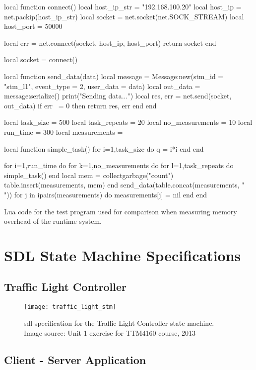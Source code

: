 \begin{appendices}
\begin{listing}[htp]
\begin{luacode}
local function connect()
	local host_ip_str = "192.168.100.20"
	local host_ip = net.packip(host_ip_str)
	local socket = net.socket(net.SOCK_STREAM)
	local host_port = 50000

	local err = net.connect(socket, host_ip, host_port)
	return socket
end

local socket = connect()

local function send_data(data)
	local message = Message:new({stm_id = "stm_l1", event_type = 2, user_data = data})
	local out_data = message:serialize()
	print("Sending data...")
	local res, err = net.send(socket, out_data)
	if err ~= 0 then
		return res, err
	end
end

local task_size = 500
local task_repeats = 20
local no_measurements = 10
local run_time = 300
local measurements = {}

local function simple_task()
	for i=1,task_size do
		q = i*i
	end
end

for i=1,run_time do
	for k=1,no_measurements do
		for l=1,task_repeats do
			simple_task()
		end
		local mem = collectgarbage("count")
		table.insert(measurements, mem)
	end
	send_data(table.concat(measurements, " "))
	for j in ipairs(measurements) do
		measurements[j] = nil
	end
end
\end{luacode}
	\caption{Lua code for the test program used for comparison when measuring memory overhead of the runtime system.}
	\label{code:memory_overhead_test}
\end{listing}

\FloatBarrier
\chapter{SDL State Machine Specifications}
\label{app:stm_sdl}

\section{Traffic Light Controller}
\label{uml:traffic_light}

\begin{figure}[htp]
	\centering
	\texttt{[image: traffic\_light\_stm]}
	\caption[SDL specification for Traffic Light Controller]{\gls{sdl} specification for the Traffic Light Controller state machine. Image source: Unit 1 exercise for TTM4160 course, 2013}
	\label{fig:traffic_light_sdl}
\end{figure}

\FloatBarrier
\pagebreak
\section{Client - Server Application}
\label{uml:client_server}


\end{appendices}
